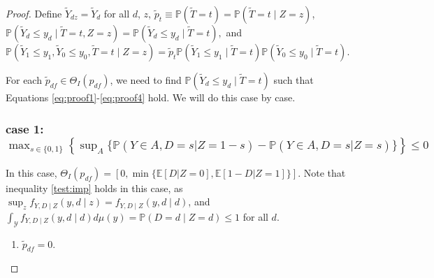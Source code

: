 \documentclass[12pt]{article}
\theoremstyle{plain}
\theoremstyle{definition}
\theoremstyle{remark}
\begin{document}
\begin{proof}
Define $\tilde{Y}_{dz}=\tilde{Y}_d$ for all $d$, $z$, $\tilde{p}_t\equiv \mathbb P(\tilde{T}=t)=\mathbb P(\tilde{T}=t \mid Z=z)$, $\mathbb P(\tilde{Y}_d \leq y_d \mid \tilde{T}=t, Z=z)=\mathbb P(\tilde{Y}_d \leq y_d \mid \tilde{T}=t),$ and $\mathbb P(\tilde{Y}_1 \leq y_1,\tilde{Y}_0 \leq y_0, \tilde{T}=t \mid Z=z)=\tilde{p}_t \mathbb P(\tilde{Y}_1 \leq y_1 \mid \tilde{T}=t) \mathbb P(\tilde{Y}_0 \leq y_0 \mid \tilde{T}=t)$.

For each $\tilde{p}_{df} \in \Theta_I(p_{df})$, we need to find $\mathbb P(\tilde{Y}_d \leq y_d \mid \tilde{T}=t)$ such that Equations \eqref{eq:proof1}-\eqref{eq:proof4} hold. We will do this case by case.

\subsubsection*{case 1: $\max_{s \in\{0,1\}}\left\{\sup _A\{\mathbb{P}(Y \in A, D=s  \vert  Z=1-s)-\mathbb{P}(Y \in A, D=s  \vert  Z=s)\}\right\} \leq 0$} 
In this case, $\Theta_I(p_{df})=[0,\min \{\mathbb{E}[D  \vert  Z=0], \mathbb{E}[1-D  \vert  Z=1]\}]$. Note that inequality \eqref{test:imp} holds in this case, as $\sup_z f_{Y,D\mid Z}(y,d \mid z)=f_{Y,D\mid Z}(y,d \mid d)$, and $\int_{\mathcal Y} f_{Y,D\mid Z}(y,d \mid d) d \mu(y)=\mathbb{P}(D=d\mid Z=d) \leq 1$ for all $d$. 

\begin{enumerate}
    \item \label{subcase1} $\tilde{p}_{df}=0$. 


\end{enumerate}
\end{proof}
\end{document}

